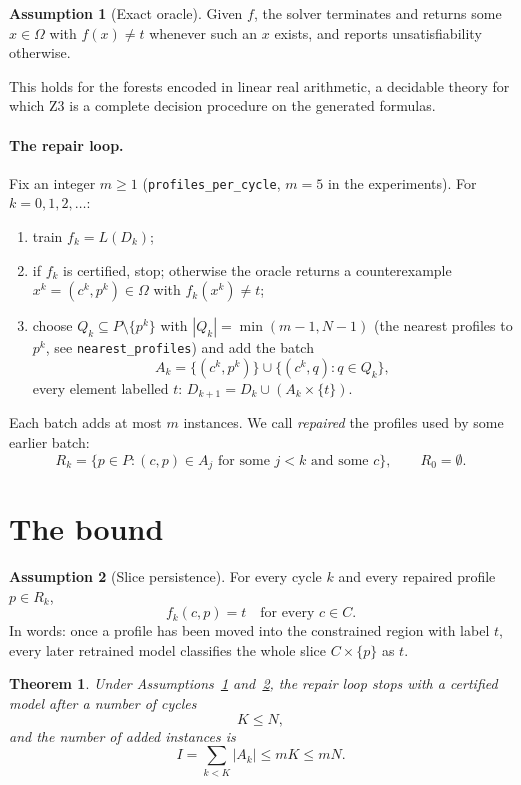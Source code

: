 \documentclass[11pt]{article}
\newtheorem{theorem}{Theorem}
\theoremstyle{definition}
\newtheorem{assumption}{Assumption}
\theoremstyle{remark}
\newcommand{\Dom}{\Omega}
\begin{document}
\begin{assumption}[Exact oracle]\label{ass:oracle}
Given $f$, the solver terminates and returns some $x\in\Dom$ with $f(x)\ne t$ whenever
such an $x$ exists, and reports unsatisfiability otherwise.
\end{assumption}

This holds for the forests encoded in linear real arithmetic, a decidable theory for which
Z3 is a complete decision procedure on the generated formulas.

\paragraph{The repair loop.}
Fix an integer $m\ge 1$ (\texttt{profiles\_per\_cycle}, $m=5$ in the experiments).
For $k=0,1,2,\dots$:
\begin{enumerate}
  \item train $f_k=L(D_k)$;
  \item if $f_k$ is certified, stop; otherwise the oracle returns a counterexample
        $x^k=(c^k,p^k)\in\Dom$ with $f_k(x^k)\ne t$;
  \item choose $Q_k\subseteq P\setminus\{p^k\}$ with $|Q_k|=\min(m-1,N-1)$
        (the nearest profiles to $p^k$, see \texttt{nearest\_profiles}) and add the batch
        \[
          A_k=\{(c^k,p^k)\}\cup\{(c^k,q) : q\in Q_k\},
        \]
        every element labelled $t$: $D_{k+1}=D_k\cup(A_k\times\{t\})$.
\end{enumerate}
Each batch adds at most $m$ instances.
We call \emph{repaired} the profiles used by some earlier batch:
\[
  R_k=\{p\in P : (c,p)\in A_j \text{ for some } j<k \text{ and some } c\},\qquad R_0=\emptyset .
\]

\section{The bound}

\begin{assumption}[Slice persistence]\label{ass:persistence}
For every cycle $k$ and every repaired profile $p\in R_k$,
\[
  f_k(c,p)=t\quad\text{for every } c\in C .
\]
In words: once a profile has been moved into the constrained region with label $t$,
every later retrained model classifies the whole slice $C\times\{p\}$ as $t$.
\end{assumption}

\begin{theorem}\label{thm:bound}
Under Assumptions~\ref{ass:oracle} and~\ref{ass:persistence}, the repair loop stops with a
certified model after a number of cycles
\[
  K\le N,
\]
and the number of added instances is
\[
  I=\sum_{k<K}|A_k|\le mK\le mN .
\]
\end{theorem}
\end{document}
